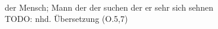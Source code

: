 \begin{exe}
\ex \label{ex:O62652} \gll {}         \object{:} \\
{der} {Mensch; Mann} {der} {der} {suchen} {der} {er} {sehr} {sich sehnen} {}\\
\glt TODO: nhd. Übersetzung (O.5,7)
\end{exe}
